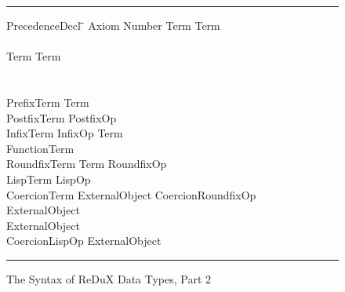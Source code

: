 \begin{figure}[htbp]
\begin{center}
\noindent
\rule{\textwidth}{0.6pt}
 
\begin{minipage}{6in}
\begin{tabbing}
{\vs PrecedenceDecl} \= \gprod \= \kill
{\vs Axiom} \> \gprod \ts{[} {\vs Number} \ts{]} {\vs Term} \ts{==} {\vs Term} \\
\\
{\vs Term} \>    
       \galt \ts{(} {\vs Term} \ts{)}  \\
  \>\>    \\
  \>\>    \\
{\vs PrefixTerm} \>  {\vs Term} \\
{\vs PostfixTerm} \>  {\vs PostfixOp} \\
{\vs InfixTerm} \>  {\vs InfixOp} {\vs Term} \\
{\vs FunctionTerm} \>  \ts{(}  \ts{)} \\
{\vs RoundfixTerm} \>  {\vs Term} 
   {\vs RoundfixOp} \\
{\vs LispTerm} \> \gprod \ts{(} {\vs LispOp}  \ts{)} \\
{\vs CoercionTerm} \>  {\vs ExternalObject} {\vs CoercionRoundfixOp} \\
  \>\>  {\vs ExternalObject} \\
  \>\>  \ts{(} {\vs ExternalObject} \ts{)} \\
  \>\> \galt \ts{(} {\vs CoercionLispOp} {\vs ExternalObject} \ts{)}
\end{tabbing}
\end{minipage}
 
\noindent
\rule{\textwidth}{0.6pt}
\caption{The Syntax of ReDuX Data Types, Part 2}
\label{dtgram2}
\end{center}
\end{figure}